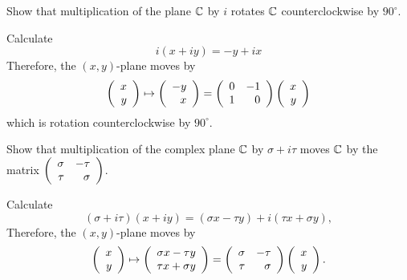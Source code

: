 \documentclass{ximera}
\begin{document}
\begin{exercise}\label{YZ_6.2_CplxMult1}
Show that multiplication of the plane $\C$ by $i$ rotates $\C$ counterclockwise by $90^\circ$. 

\begin{solution}
\soln
Calculate
\[
i (x+iy) = -y +ix
\]
Therefore, the $(x,y)$-plane moves by 
\[
 \Matrix{x\\y} \mapsto \Matrix{-y\\x} = \Matrix{ 0 & -1 \\ 1 & 0 } \Matrix{x\\y}
\]
which is rotation counterclockwise by $90^\circ$.
\end{solution}
\end{exercise}


\begin{exercise} \label{YZ_6.2_CplxMult1}
Show that multiplication of the complex plane $\C$ by $\sigma+i\tau$ moves $\C$ 
by the matrix $\Matrix{\sigma&-\tau\\ \tau&\sigma}$.

\begin{solution}
\soln
Calculate
\[
(\sigma+i\tau) (x+iy) = (\sigma x - \tau y)+i(\tau x + \sigma y),
\]
Therefore, the $(x,y)$-plane moves by
\[
 \Matrix{x\\y} \mapsto \Matrix{\sigma x - \tau y \\ \tau x + \sigma y} = 
 \Matrix{ \sigma & -\tau \\ \tau & \sigma } \Matrix{x\\y}.
\]
\end{solution}

\end{exercise}
\end{document}
